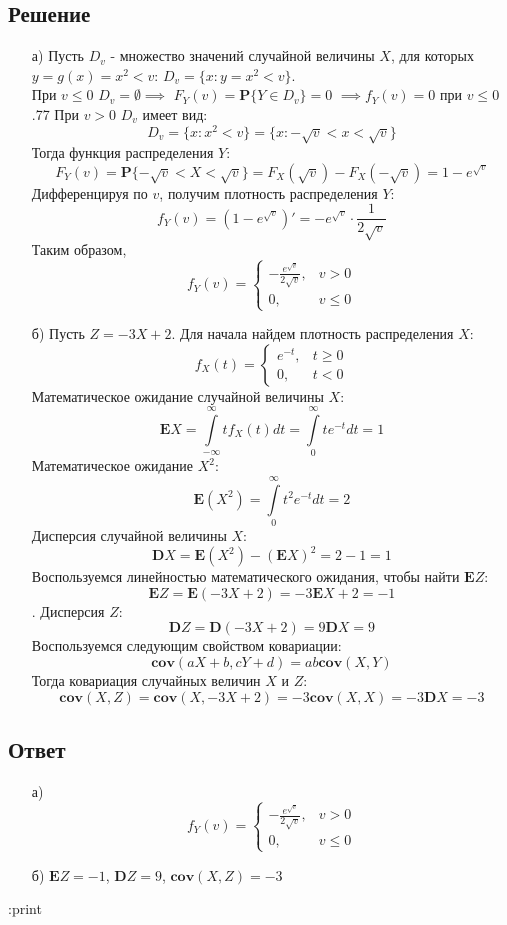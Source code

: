 \documentclass[fleqn, 10pt]{article}
\begin{document}
\subsection{Решение}
\begin{itemize}
\item[а)] Пусть \(D_v\) - множество значений случайной величины \(X\), для которых \(y=g(x)=x^2 < v\): \(D_v=\{x : y = x^2 < v\}\). \\
При \(v \leq 0\) \(D_v = \emptyset \implies\) \mbox{\(F_Y(v) =\textbf{P}\{Y\in D_v\} = 0\)} \(\implies f_Y(v) = 0\) при \(v \leq 0\).77
При \(v > 0\) \(D_v\) имеет вид:
\[D_v = \{x : x^2 < v\} = \{x : -\sqrt{v} < x < \sqrt{v}\}\]
Тогда функция распределения \(Y\):
\[F_Y(v) = \textbf{P}\{-\sqrt{v} < X < \sqrt{v}\} = F_X(\sqrt{v}) - F_X(-\sqrt{v}) = 1 - e^{\sqrt{v}}\]
Дифференцируя по \(v\), получим плотность распределения \(Y\):
\[f_Y(v) = (1 - e^{\sqrt{v}})' = -e^{\sqrt{v}}\cdot\frac{1}{2\sqrt{v}}\]
Таким образом,
\[f_Y(v) =
\begin{cases}
  -\frac{e^{\sqrt{v}}}{2\sqrt{v}}, & v > 0 \\
  0, & v \leq 0
\end{cases}
\]
\item[б)] Пусть \(Z = -3X + 2\).
  Для начала найдем плотность распределения \(X\):
  \[f_X(t) =
  \begin{cases}
    e^{-t}, & t \geq 0 \\
    0, & t < 0
  \end{cases}
  \]
  Математическое ожидание случайной величины \(X\):
  \[\textbf{E}X = \int\limits_{-\infty}^{\infty}{tf_X(t)dt} = \int\limits_{0}^{\infty}{te^{-t}dt} = 1\]
  Математическое ожидание \(X^2\):
  \[\textbf{E}(X^2) = \int\limits_{0}^{\infty}{t^2e^{-t}dt} = 2\]
  Дисперсия случайной величины \(X\):
  \[\textbf{D}X = \textbf{E}(X^2) - (\textbf{E}X)^2 = 2 - 1 = 1\]
  Воспользуемся линейностью математического ожидания, чтобы найти \(\textbf{E}Z\):
  \[\textbf{E}Z = \textbf{E}(-3X+2) = -3\textbf{E}X + 2 = -1\].
  Дисперсия \(Z\):
  \[\textbf{D}Z = \textbf{D}(-3X+2) = 9\textbf{D}X = 9\]
  Воспользуемся следующим свойством ковариации:
  \[\textbf{cov}(aX+b, cY+d) = ab\textbf{cov}(X,Y)\]
  Тогда ковариация случайных величин \(X\) и \(Z\):
  \[\textbf{cov}(X, Z) = \textbf{cov}(X, -3X+2) = -3\textbf{cov}(X, X) = -3\textbf{D}X = -3\]
  \end{itemize}
\subsection{Ответ}
\begin{itemize}
\item[а)]
  \[f_Y(v) =
\begin{cases}
  -\frac{e^{\sqrt{v}}}{2\sqrt{v}}, & v > 0 \\
  0, & v \leq 0
\end{cases}
\]
\item[б)] \(\textbf{E}Z = -1\), \(\textbf{D}Z = 9\), \(\textbf{cov}(X,Z) = -3\)
\end{itemize}
\newpage:print
\end{document}
